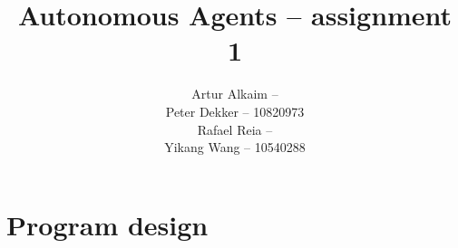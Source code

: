 \documentclass{article}
\begin{document}
\title{Autonomous Agents -- assignment 1}
\author{
Artur Alkaim --\\
Peter Dekker -- 10820973\\
Rafael Reia --\\
Yikang Wang -- 10540288\\
}
\maketitle
\section{Program design}
\end{document}
